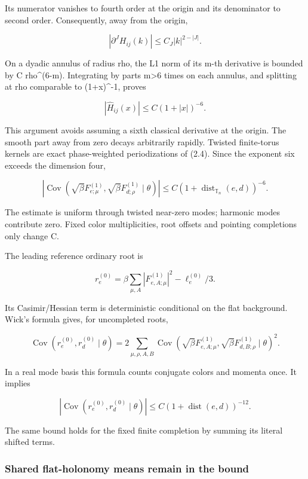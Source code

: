 \documentclass[
  11pt,
]{article}
\begin{document}
Its numerator vanishes to fourth order at the origin and its denominator
to second order. Consequently, away from the origin,

\[
 |\partial^J H_{ij}(k)|\le C_J|k|^{2-|J|}.
\tag{2.3}
\]

On a dyadic annulus of radius rho, the L1 norm of its m-th derivative is
bounded by C rho\^{}(6-m). Integrating by parts m\textgreater6 times on
each annulus, and splitting at rho comparable to
(1+\textbar x\textbar)\^{}-1, proves

\[
 |\widehat H_{ij}(x)|\le C(1+|x|)^{-6}.
\tag{2.4}
\]

This argument avoids assuming a sixth classical derivative at the
origin. The smooth part away from zero decays arbitrarily rapidly.
Twisted finite-torus kernels are exact phase-weighted periodizations of
(2.4). Since the exponent six exceeds the dimension four,

\[
 \boxed{\quad
 |\operatorname{Cov}(\sqrt\beta F_{e;\mu}^{(1)},
                    \sqrt\beta F_{d;\rho}^{(1)}\mid\theta)|
 \le C(1+\operatorname{dist}_{\mathbb T_n}(e,d))^{-6}.
 \quad}
\tag{2.5}
\]

The estimate is uniform through twisted near-zero modes; harmonic modes
contribute zero. Fixed color multiplicities, root offsets and pointing
completions only change C.

The leading reference ordinary root is

\[
 r_e^{(0)}=\beta\sum_{\mu,A}|F_{e,A;\mu}^{(1)}|^2
                  -\ell_e^{(0)}/3.
\]

Its Casimir/Hessian term is deterministic conditional on the flat
background. Wick's formula gives, for uncompleted roots,

\[
 \operatorname{Cov}(r_e^{(0)},r_d^{(0)}\mid\theta)
 =2\sum_{\mu,\rho,A,B}
 \operatorname{Cov}(\sqrt\beta F_{e,A;\mu}^{(1)},
                    \sqrt\beta F_{d,B;\rho}^{(1)}\mid\theta)^2.
\tag{2.6}
\]

In a real mode basis this formula counts conjugate colors and momenta
once. It implies

\[
 |\operatorname{Cov}(r_e^{(0)},r_d^{(0)}\mid\theta)|
 \le C(1+\operatorname{dist}(e,d))^{-12}.
\tag{2.7}
\]

The same bound holds for the fixed finite completion by summing its
literal shifted terms.

\hypertarget{shared-flat-holonomy-means-remain-in-the-bound}{%
\subsubsection{Shared flat-holonomy means remain in the
bound}\label{shared-flat-holonomy-means-remain-in-the-bound}}
\end{document}
